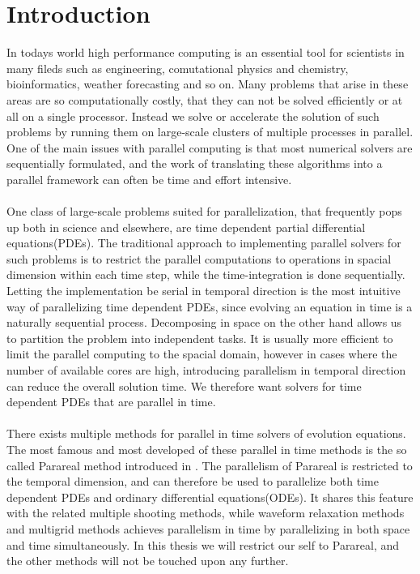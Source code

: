 \chapter{Introduction}
In todays world high performance computing is an essential tool for scientists in many fileds such as engineering, comutational physics and chemistry, bioinformatics, weather forecasting and so on. Many problems that arise in these areas are so computationally costly, that they can not be solved efficiently or at all on a single processor. Instead we solve or accelerate the solution of such problems by running them on large-scale clusters of multiple processes in parallel. One of the main issues with parallel computing is that most numerical solvers are sequentially formulated, and the work of translating these algorithms into a parallel framework can often be time and effort intensive.
\\
\\
One class of large-scale problems suited for parallelization, that frequently pops up both in science and elsewhere, are time dependent partial differential equations(PDEs). The traditional approach to implementing parallel solvers for such problems is to restrict the parallel computations to operations in spacial dimension within each time step, while the time-integration is done sequentially. Letting the implementation be serial in temporal direction is the most intuitive way of parallelizing time dependent PDEs, since evolving an equation in time is a naturally sequential process. Decomposing in space on the other hand allows us to partition the problem into independent tasks. It is usually more efficient to limit the parallel computing to the spacial domain, however in cases where the number of available cores are high, introducing parallelism in temporal direction can reduce the overall solution time. We therefore want solvers for time dependent PDEs that are parallel in time.
\\
\\
There exists multiple methods for parallel in time solvers of evolution equations. The most famous and most developed of these parallel in time methods is the so called Parareal method introduced in \cite{lions2001resolution}. The parallelism of Parareal is restricted to the temporal dimension, and can therefore be used to parallelize both time dependent PDEs and ordinary differential equations(ODEs). It shares this feature with the related multiple shooting methods\cite{nievergelt1964parallel,bellen1989parallel}, while waveform relaxation methods\cite{lelarasmee1982waveform,gander1996overlapping} and multigrid methods\cite{hackbusch1985parabolic,lubich1987multi,horton1995space} achieves parallelism in time by parallelizing in both space and time simultaneously. In this thesis we will restrict our self to Parareal, and the other methods will not be touched upon any further.
